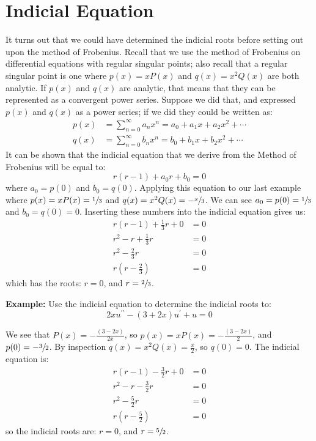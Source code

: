 \section{Indicial Equation}
It turns out that we could have determined the indicial roots before setting out upon the method of Frobenius.  Recall that we use the method of Frobenius on differential equations with regular singular points; also recall that a regular singular point is one where $p(x)=xP(x)$ and $q(x)=x^2Q(x)$ are both analytic.  If $p(x)$ and $q(x)$ are analytic, that means that they can be represented as a convergent power series.  Suppose we did that, and expressed $p(x)$ and $q(x)$ as a power series; if we did they could be written as:
\begin{align*}
p(x) &= \sum\limits_{n=0}^{\infty} a_nx^n = a_0 + a_1x + a_2x^2 + \cdots \\
q(x) &= \sum\limits_{n=0}^{\infty} b_nx^n = b_0 + b_1x + b_2x^2 + \cdots
\end{align*}
It can be shown that the indicial equation that we derive from the Method of Frobenius will be equal to:
\begin{equation*}
r(r-1)+a_0r + b_0 = 0
\end{equation*}
where $a_0 = p(0)$ and $b_0 = q(0)$.  Applying this equation to our last example where $p(x)=xP(x) = \sfrac{1}{3}$ and $q(x) = x^2 Q(x) = -\sfrac{x}{3}$.  We can see $a_0 = p(0) = \sfrac{1}{3}$ and $b_0 = q(0) = 0$.  Inserting these numbers into the indicial equation gives us:
\begin{align*}
r(r-1)+\frac{1}{3}r + 0 &= 0 \\
r^2-r + \frac{1}{3}r &= 0 \\
r^2 - \frac{2}{3}r &= 0 \\
r(r-\frac{2}{3}) &=0
\end{align*}
which has the roots: $r = 0$, and $r = \sfrac{2}{3}$.

\vspace{0.5cm}

\noindent\textbf{Example:}  Use the indicial equation to determine the indicial roots to:
\begin{equation*}
2xu^{\prime \prime} - (3+2x)u^{\prime} + u = 0
\end{equation*}

\vspace{0.25cm}

\noindent We see that $P(x) = -\frac{(3 - 2x)}{2x}$, so $p(x) = xP(x) = -\frac{(3-2x)}{2}$, and $p(0) = -\sfrac{3}{2}$.  By inspection $q(x) = x^2Q(x) = \frac{x}{2}$, so $q(0) = 0$.  The indicial equation is:
\begin{align*}
r(r-1)-\frac{3}{2}r + 0 &= 0 \\
r^2-r - \frac{3}{2}r &= 0 \\
r^2 - \frac{5}{2}r &= 0 \\
r\left(r-\frac{5}{2}\right) &= 0
\end{align*}
so the indicial roots are: $r = 0$, and $r = \sfrac{5}{2}$.



